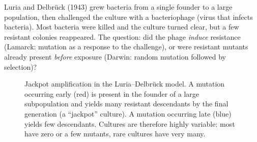 Luria and Delbr{\"u}ck (1943) grew bacteria from a single founder to a large population, then challenged the culture with a bacteriophage (virus that infects bacteria). Most bacteria were killed and the culture turned clear, but a few resistant colonies reappeared. The question: did the phage \emph{induce} resistance (Lamarck: mutation as a response to the challenge), or were resistant mutants already present \emph{before} exposure (Darwin: random mutation followed by selection)?

\begin{figure}[hbt]
\centering
{}
\caption{Jackpot amplification in the Luria--Delbr{\"u}ck model. A mutation occurring early (red) is present in the founder of a large subpopulation and yields many resistant descendants by the final generation (a ``jackpot'' culture). A mutation occurring late (blue) yields few descendants. Cultures are therefore highly variable: most have zero or a few mutants, rare cultures have very many.}
\label{fig:lecture03-jackpot}
\end{figure}

